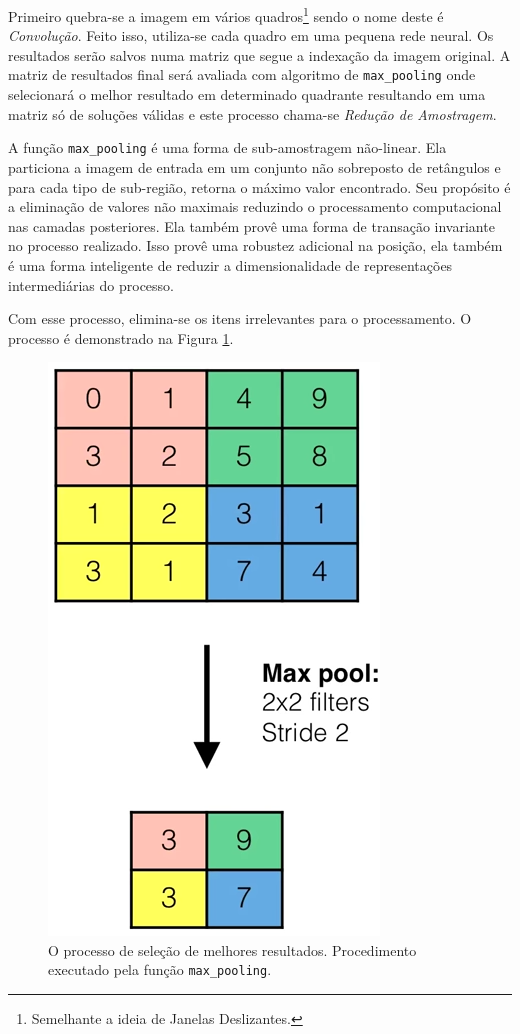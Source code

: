 \documentclass[10pt, conference]{IEEEtran}
\begin{document}
				Primeiro quebra-se a imagem em vários quadros\footnote{Semelhante a ideia de Janelas Deslizantes.} sendo o nome deste é \textit{Convolução}. Feito isso, utiliza-se cada quadro em uma pequena rede neural. Os resultados serão salvos numa matriz que segue a indexação da imagem original. A matriz de resultados final será avaliada com algoritmo de \texttt{max\_pooling} onde selecionará o melhor resultado em determinado quadrante resultando em uma matriz só de soluções válidas e este processo chama-se \textit{Redução de Amostragem}.

				A função \texttt{max\_pooling} é uma forma de sub-amostragem não-linear. Ela particiona a imagem de entrada em um conjunto não sobreposto de retângulos e para cada tipo de sub-região, retorna o máximo valor encontrado. Seu propósito é a eliminação de valores não maximais reduzindo o processamento computacional nas camadas posteriores. Ela também provê uma forma de transação invariante no processo realizado. Isso provê uma robustez adicional na posição, ela também é uma forma inteligente de reduzir a dimensionalidade de representações intermediárias do processo.

				Com esse processo, elimina-se os itens irrelevantes para o processamento. O processo é demonstrado na Figura \ref{fig:max_pooling.png}.

				\begin{figure}[H]
					\centering
					\includegraphics[width=0.5\linewidth]{img/max_pooling.png}
					\caption{O processo de seleção de melhores resultados. Procedimento executado pela função \texttt{max\_pooling}.}
					\label{fig:max_pooling.png}
				\end{figure}
\end{document}
